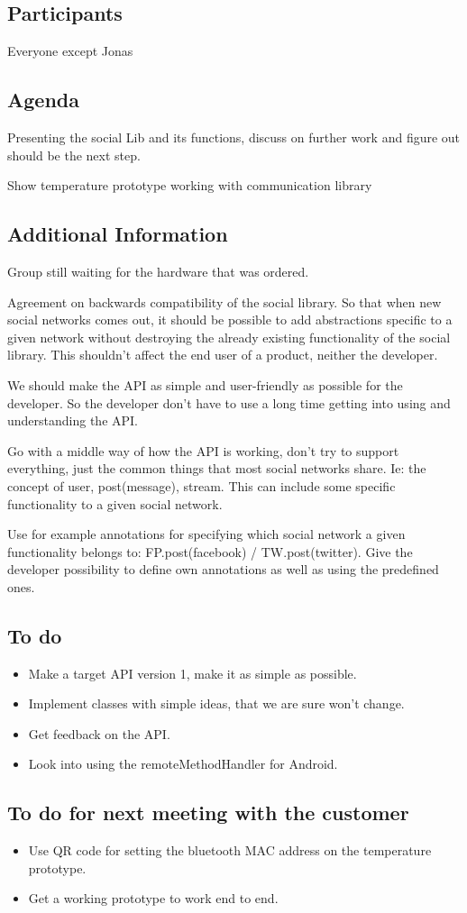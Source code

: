 \subsection{Participants}

 Everyone except Jonas

\subsection{Agenda}
Presenting the social Lib and its functions, discuss on further work and figure out should be the next step.

Show temperature prototype working with communication library

\subsection{Additional Information}
Group still waiting for the hardware that was ordered.

Agreement on backwards compatibility of the social library. So that when new social networks comes out, it should be possible to add abstractions specific to a given network without destroying the already existing functionality of the social library. This shouldn't affect the end user of a product, neither the developer. 

We should make the API as simple and user-friendly as possible for the developer. So the developer don't have to use a long time getting into using and understanding the API.

Go with a middle way of how the API is working, don't try to support everything, just the common things that most social networks share. Ie: the concept of user, post(message), stream.
This can include some specific functionality to a given social network. 

Use for example annotations for specifying which social network a given functionality belongs to: FP.post(facebook) / TW.post(twitter). Give the developer possibility to define own annotations as well as using the predefined ones.

\subsection{To do}

\begin{itemize}
\item  Make a target API version 1, make it as simple as possible.
\item Implement classes with simple ideas, that we are sure won't change.
\item Get feedback on the API.
\item Look into using the remoteMethodHandler for Android.
\end{itemize}



\subsection{To do for next meeting with the customer}

\begin{itemize}
\item Use QR code for setting the bluetooth MAC address on the temperature prototype.
\item Get a working prototype to work end to end.
\end{itemize}